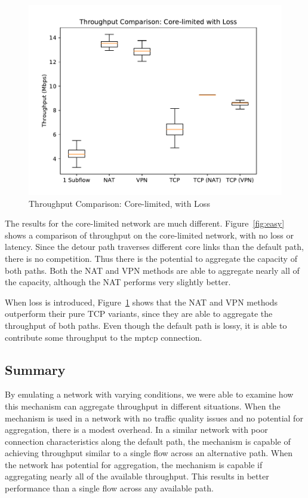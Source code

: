 \documentclass{cwru}
\begin{document}
\begin{figure}[p]
  \centering
  \includegraphics[height=0.45\textheight]{figures/lossy.pdf}
  \caption{Throughput Comparison: Core-limited, with Loss}
  \label{fig:lossy}
\end{figure}

The results for the core-limited network are much different.
Figure~\ref{fig:easy} shows a comparison of throughput on the core-limited
network, with no loss or latency. Since the detour path traverses different core
links than the default path, there is no competition. Thus there is the
potential to aggregate the capacity of both paths. Both the NAT and VPN methods
are able to aggregate nearly all of the capacity, although the NAT performs very
slightly better.

When loss is introduced, Figure~\ref{fig:lossy} shows that the NAT and VPN
methods outperform their pure TCP variants, since they are able to aggregate the
throughput of both paths. Even though the default path is lossy, it is able to
contribute some throughput to the \ac{mptcp} connection.

\subsection{Summary}

By emulating a network with varying conditions, we were able to examine how this
mechanism can aggregate throughput in different situations. When the mechanism
is used in a network with no traffic quality issues and no potential for
aggregation, there is a modest overhead. In a similar network with poor
connection characteristics along the default path, the mechanism is capable of
achieving throughput similar to a single flow across an alternative path.
When the network has potential for aggregation, the mechanism is capable if
aggregating nearly all of the available throughput. This results in better
performance than a single flow across any available path.
\end{document}
